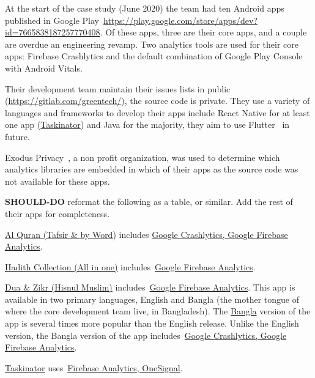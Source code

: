 At the start of the case study (June 2020) the team had ten Android apps published in Google Play~\url{https://play.google.com/store/apps/dev?id=7665838187257770408}. Of these apps, three are their core apps, and a couple are overdue an engineering revamp.  Two analytics tools are used for their core apps: Firebase Crashlytics and the default combination of Google Play Console with Android Vitals.

Their development team maintain their issues lists in public (\url{https://gitlab.com/greentech/}), the source code is private. They use a variety of languages and frameworks to develop their apps include React Native for at least one app (\href{https://play.google.com/store/apps/details?id=com.taskinator}{Taskinator}) and Java for the majority, they aim to use Flutter~\cite{flutter_dev_site} in future.

Exodus Privacy~\cite{exodus_privacy_project}, a non profit organization, was used to determine which analytics libraries are embedded in which of their apps as the source code was not available for these apps.

\textbf{SHOULD-DO} reformat the following as a table, or similar. Add the rest of their apps for completeness.

\href{https://play.google.com/store/apps/details?id=com.greentech.quran}{Al Quran (Tafsir \& by Word)} includes \href{https://reports.exodus-privacy.eu.org/en/reports/com.greentech.quran/latest/}{Google Crashlytics, Google Firebase Analytics}.

\href{https://play.google.com/store/apps/details?id=com.greentech.hadith}{	
Hadith Collection (All in one)} includes~\href{https://reports.exodus-privacy.eu.org/en/reports/77502/}{Google Firebase Analytics}.

\href{https://play.google.com/store/apps/details?id=com.greentech.hisnulmuslim}{	
Dua \& Zikr (Hisnul Muslim)} includes~\href{https://reports.exodus-privacy.eu.org/en/reports/54714/}{Google Firebase Analytics}. This app is available in two primary languages, English and Bangla (the mother tongue of where the core development team live, in Bangladesh). The \href{https://play.google.com/store/apps/details?id=com.greentech.hisnulmuslimbn}{Bangla} version of the app is several times more popular than the English release. Unlike the English version, the Bangla version of the app includes~\href{https://reports.exodus-privacy.eu.org/en/reports/146430/}{Google Crashlytics, Google Firebase Analytics}.

\href{https://play.google.com/store/apps/details?id=com.taskinator}{Taskinator} uses~\href{https://reports.exodus-privacy.eu.org/en/reports/146496/}{Firebase Analytics, OneSignal}.

